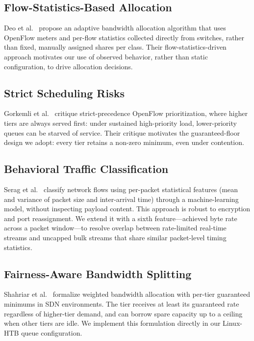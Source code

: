 \documentclass[conference]{IEEEtran}
\begin{document}
\subsection{Flow-Statistics-Based Allocation}
Deo et al.~\cite{deo2024} propose an adaptive bandwidth allocation
algorithm that uses OpenFlow meters and per-flow statistics collected
directly from switches, rather than fixed, manually assigned shares
per class. Their flow-statistics-driven approach motivates our use of
observed behavior, rather than static configuration, to drive
allocation decisions.

\subsection{Strict Scheduling Risks}
Gorkemli et al.~\cite{gorkemli2015} critique strict-precedence
OpenFlow prioritization, where higher tiers are always served first:
under sustained high-priority load, lower-priority queues can be
starved of service. Their critique motivates the guaranteed-floor
design we adopt: every tier retains a non-zero minimum, even under
contention.

\subsection{Behavioral Traffic Classification}
Serag et al.~\cite{serag2025} classify network flows using per-packet
statistical features (mean and variance of packet size and
inter-arrival time) through a machine-learning model, without
inspecting payload content. This approach is robust to encryption and
port reassignment. We extend it with a sixth feature—achieved byte
rate across a packet window—to resolve overlap between rate-limited
real-time streams and uncapped bulk streams that share similar
packet-level timing statistics.

\subsection{Fairness-Aware Bandwidth Splitting}
Shahriar et al.~\cite{shahriar2024} formalize weighted bandwidth
allocation with per-tier guaranteed minimums in SDN environments. The
tier receives at least its guaranteed rate regardless of higher-tier
demand, and can borrow spare capacity up to a ceiling when other tiers
are idle. We implement this formulation directly in our Linux-HTB queue
configuration.

\end{document}
